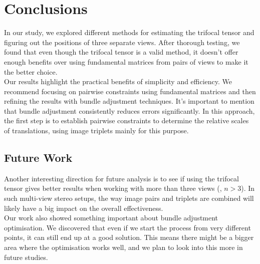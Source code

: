 \section{Conclusions}\label{sec:conclusions}
In our study, we explored different methods for estimating the trifocal tensor and figuring out the positions of three separate views. After thorough testing, we found that even though the trifocal tensor is a valid method, it doesn't offer enough benefits over using fundamental matrices from pairs of views to make it the better choice.\\

Our results highlight the practical benefits of simplicity and efficiency. We recommend focusing on pairwise constraints using fundamental matrices and then refining the results with bundle adjustment techniques. It's important to mention that bundle adjustment consistently reduces errors significantly. In this approach, the first step is to establish pairwise constraints to determine the relative scales of translations, using image triplets mainly for this purpose.

\subsection{Future Work}
Another interesting direction for future analysis is to see if using the trifocal tensor gives better results when working with more than three views (\ie, \( n > 3 \)). In such multi-view stereo setups, the way image pairs and triplets are combined will likely have a big impact on the overall effectiveness.\\

Our work also showed something important about bundle adjustment optimisation. We discovered that even if we start the process from very different points, it can still end up at a good solution. This means there might be a bigger area where the optimisation works well, and we plan to look into this more in future studies.

